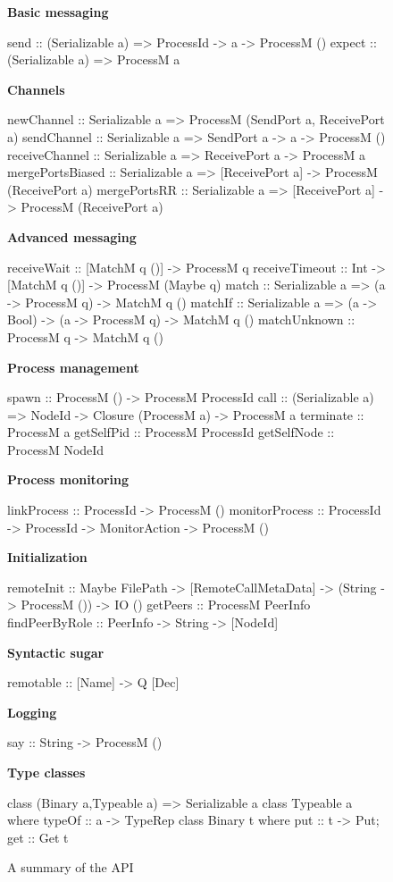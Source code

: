 \documentclass[preprint]{sigplanconf}
\begin{document}
\begin{figure}[t!]
\textbf{Basic messaging} 
\begin{code}
send :: (Serializable a) => ProcessId -> a -> ProcessM ()
expect :: (Serializable a) => ProcessM a
\end{code}
 \textbf{Channels}
\begin{code}
newChannel :: Serializable a => ProcessM (SendPort a, ReceivePort a)
sendChannel :: Serializable a => SendPort a -> a -> ProcessM ()
receiveChannel :: Serializable a => ReceivePort a -> ProcessM a
mergePortsBiased :: Serializable a => [ReceivePort a] -> ProcessM (ReceivePort a)
mergePortsRR :: Serializable a => [ReceivePort a] -> ProcessM (ReceivePort a)
\end{code}

 \textbf{Advanced messaging}
\begin{code}
receiveWait :: [MatchM q ()] -> ProcessM q
receiveTimeout :: Int -> [MatchM q ()] -> ProcessM (Maybe q)
match :: Serializable a => (a -> ProcessM q) -> MatchM q ()
matchIf :: Serializable a => (a -> Bool) -> (a -> ProcessM q) -> MatchM q ()
matchUnknown :: ProcessM q -> MatchM q ()
\end{code}

 \textbf{Process management}
\begin{code}
spawn :: ProcessM () -> ProcessM ProcessId
call :: (Serializable a) => NodeId -> Closure (ProcessM a) -> ProcessM a
terminate :: ProcessM a
getSelfPid :: ProcessM ProcessId
getSelfNode :: ProcessM NodeId
\end{code}

 \textbf{Process monitoring}
\begin{code}
linkProcess :: ProcessId -> ProcessM ()
monitorProcess :: ProcessId -> ProcessId -> MonitorAction -> ProcessM ()
\end{code}

 \textbf{Initialization}
\begin{code}
remoteInit :: Maybe FilePath -> [RemoteCallMetaData] -> (String -> ProcessM ()) -> IO ()
getPeers :: ProcessM PeerInfo
findPeerByRole :: PeerInfo -> String -> [NodeId]
\end{code}

 \textbf{Syntactic sugar}
\begin{code}
remotable :: [Name] -> Q [Dec]
\end{code}

 \textbf{Logging}
\begin{code}
say :: String -> ProcessM ()
\end{code}

 \textbf{Type classes}
\begin{code}
class (Binary a,Typeable a) => Serializable a
class Typeable a where typeOf :: a -> TypeRep
class Binary t where put :: t -> Put; get :: Get t
\end{code}
\caption{A summary of the API} \label{fig:api}
\end{figure}
\end{document}
